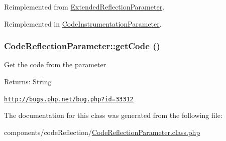 Reimplemented from \hyperlink{class_extended_reflection_parameter_fc7cab8ac6553754c4c4c62ba8be8685}{ExtendedReflectionParameter}.

Reimplemented in \hyperlink{class_code_instrumentation_parameter_e0c68e69aa93979e2e1fa3057bd39d5a}{CodeInstrumentationParameter}.\hypertarget{class_code_reflection_parameter_16918720d7f6522b9a9baa9cfbb4cfc7}{
\subsubsection[{getCode}]{\setlength{\rightskip}{0pt plus 5cm}CodeReflectionParameter::getCode ()}}
\label{class_code_reflection_parameter_16918720d7f6522b9a9baa9cfbb4cfc7}


Get the code from the parameter

\begin{Desc}
\item[Returns:]String \end{Desc}


\href{http://bugs.php.net/bug.php?id=33312}{\tt http://bugs.php.net/bug.php?id=33312}

The documentation for this class was generated from the following file:\begin{CompactItemize}
\item 
components/codeReflection/\hyperlink{_code_reflection_parameter_8class_8php}{CodeReflectionParameter.class.php}\end{CompactItemize}
